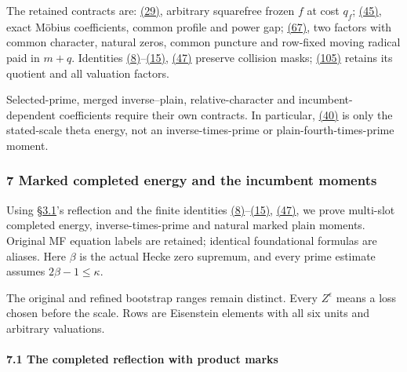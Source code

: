 The retained contracts are: \protect\hyperlink{cf:eq:B.13}{(29)}, arbitrary squarefree frozen \(f\) at cost \(q_f\); \protect\hyperlink{cf:eq:C.1}{(45)}, exact Möbius coefficients, common profile and power gap; \protect\hyperlink{cf:eq:D.3}{(67)}, two factors with common character, natural zeros, common puncture and row-fixed moving radical paid in \(m+q\). Identities \protect\hyperlink{cf:eq:A.12}{(8)}--\protect\hyperlink{cf:eq:A.19}{(15)}, \protect\hyperlink{cf:eq:C.3}{(47)} preserve collision masks; \protect\hyperlink{cf:eq:2.8}{(105)} retains its quotient and all valuation factors.

Selected-prime, merged inverse--plain, relative-character and incumbent-dependent coefficients require their own contracts. In particular, \protect\hyperlink{cf:eq:4.6}{(40)} is only the stated-scale theta energy, not an inverse-times-prime or plain-fourth-times-prime moment.

\hypertarget{mf:chapter}{}

\label{mf:chapter}

\hypertarget{marked-completed-energy-and-the-incumbent-moments}{%
\subsubsection{7 Marked completed energy and the incumbent moments}\label{marked-completed-energy-and-the-incumbent-moments}}

Using §\protect\hyperlink{cf:reflection}{3.1}'s reflection and the finite identities \protect\hyperlink{cf:eq:A.12}{(8)}--\protect\hyperlink{cf:eq:A.19}{(15)}, \protect\hyperlink{cf:eq:C.3}{(47)}, we prove multi-slot completed energy, inverse-times-prime and natural marked plain moments. Original MF equation labels are retained; identical foundational formulas are aliases. Here \(\beta\) is the actual Hecke zero supremum, and every prime estimate assumes \(2\beta-1\le\kappa\).

The original and refined bootstrap ranges remain distinct. Every \(Z^\epsilon\) means a loss chosen before the scale. Rows are Eisenstein elements with all six units and arbitrary valuations.

\hypertarget{the-completed-reflection-with-product-marks}{}

\label{the-completed-reflection-with-product-marks}

\hypertarget{the-completed-reflection-with-product-marks-heading-2}{%
\paragraph{7.1 The completed reflection with product marks}}

